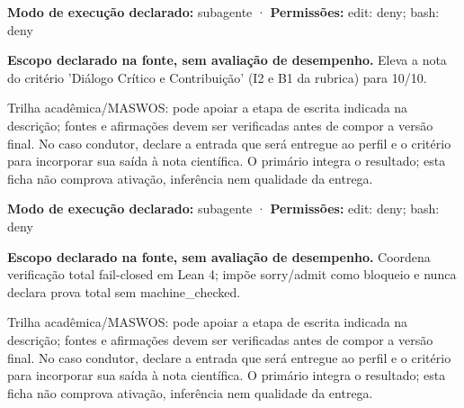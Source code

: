 \begin{arquitetura}
\textbf{Modo de execução declarado:} subagente · \textbf{Permissões:} edit: deny; bash: deny
\end{arquitetura}


\begin{descricao}
\textbf{Escopo declarado na fonte, sem avaliação de desempenho.}
Eleva a nota do critério 'Diálogo Crítico e Contribuição' (I2 e B1 da rubrica) para 10/10.
\end{descricao}

\begin{funcao}
Trilha acadêmica/MASWOS: pode apoiar a etapa de escrita indicada na descrição; fontes e afirmações devem ser verificadas antes de compor a versão final. No caso condutor, declare a entrada que será entregue ao perfil e o critério para incorporar sua saída à nota científica. O primário integra o resultado; esta ficha não comprova ativação, inferência nem qualidade da entrega.
\end{funcao}

\begin{arquitetura}
\textbf{Modo de execução declarado:} subagente · \textbf{Permissões:} edit: deny; bash: deny
\end{arquitetura}


\begin{descricao}
\textbf{Escopo declarado na fonte, sem avaliação de desempenho.}
Coordena verificação total fail-closed em Lean 4; impõe sorry/admit como bloqueio e nunca declara prova total sem machine\_checked.
\end{descricao}

\begin{funcao}
Trilha acadêmica/MASWOS: pode apoiar a etapa de escrita indicada na descrição; fontes e afirmações devem ser verificadas antes de compor a versão final. No caso condutor, declare a entrada que será entregue ao perfil e o critério para incorporar sua saída à nota científica. O primário integra o resultado; esta ficha não comprova ativação, inferência nem qualidade da entrega.
\end{funcao}

